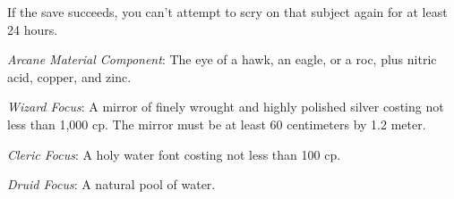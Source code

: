 {	If the save succeeds, you can't attempt to scry on that subject again for at least 24 hours.

	\textit{Arcane Material Component}:
	The eye of a hawk, an eagle, or a roc, plus nitric acid, copper, and zinc.

	\textit{Wizard Focus}:
	A mirror of finely wrought and highly polished silver costing not less than 1,000 cp. The mirror must be at least 60 centimeters by 1.2 meter.

	\textit{Cleric Focus}:
	A holy water font costing not less than 100 cp.

	\textit{Druid Focus}:
	A natural pool of water.

}
